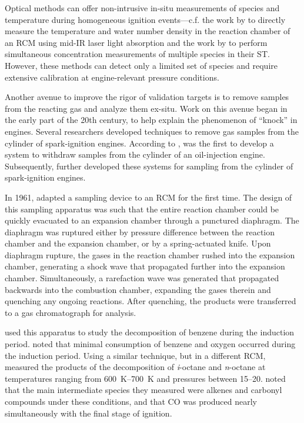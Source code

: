 \documentclass[../main.tex]{subfiles}
\begin{document}
Optical methods can offer non-intrusive in-situ measurements of species
and temperature during homogeneous ignition events---c.f. the work by
\textcite{Das2012, Uddi2012} to directly measure the temperature and
water number density in the reaction chamber of an RCM using mid-IR
laser light absorption and the work by \textcite{Stranic2013} to perform
simultaneous concentration measurements of multiple species in their
ST. However, these methods can detect only a limited set of
species and require extensive calibration at engine-relevant pressure
conditions.

Another avenue to improve the rigor of validation targets is to remove
samples from the reacting gas and analyze them ex-situ. Work on this
avenue began in the early part of the 20th century, to help explain the
phenomenon of ``knock'' in engines. Several researchers developed
techniques to remove gas samples from the cylinder of spark-ignition
engines. According to \textcite{Withrow1930}, \textcite{Brooks1922} was
the first to develop a system to withdraw samples from the cylinder of
an oil-injection engine. Subsequently, \textcite{Callendar1926,
Egerton1926, Lovell1927, Ricardo1928, Withrow1930, Steele1933, Egerton1935,
Downs1951, Pahnke1954} further developed these systems for sampling from
the cylinder of spark-ignition engines.

In 1961, \textcite{Roblee1961} adapted a sampling device to an RCM for
the first time. The design of this sampling apparatus was such that the
entire reaction chamber could be quickly evacuated to an expansion chamber
through a punctured diaphragm. The diaphragm was ruptured either by
pressure difference between the reaction chamber and the expansion
chamber, or by a spring-actuated knife. Upon diaphragm rupture, the
gases in the reaction chamber rushed into the expansion chamber,
generating a shock wave that propagated further into the expansion
chamber. Simultaneously, a rarefaction wave was generated that
propagated backwards into the combustion chamber, expanding the gases
therein and quenching any ongoing reactions. After quenching, the
products were transferred to a gas chromatograph for analysis.

\textcite{Roblee1961} used this apparatus to study the decomposition of
benzene during the induction period. \textcite{Roblee1961} noted that minimal
consumption of benzene and oxygen occurred during the induction period.
Using a similar technique, but in a different RCM, \textcite{Martinengo1965}
measured the products of the decomposition of \textit{i}-octane and
\textit{n}-octane at temperatures ranging from \SIrange{600}{700}{\kelvin}
and pressures between \SIrange{15}{20}{\atmosphere}. \textcite{Martinengo1965}
noted that the main intermediate species they measured were alkenes and carbonyl
compounds under these conditions, and that CO was produced nearly simultaneously
with the final stage of ignition.
\end{document}
